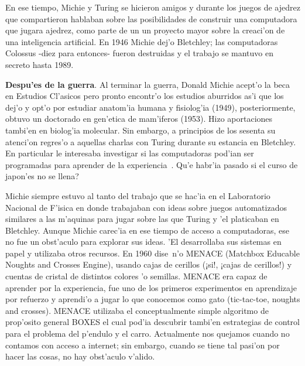 \documentclass[11pt]{article}
\begin{document}
En ese tiempo, Michie y Turing se hicieron amigos y durante los juegos de ajedrez que compartieron hablaban sobre las posibilidades de construir una computadora que jugara ajedrez, como parte de un un proyecto mayor sobre la creaci'on de una inteligencia artificial. En 1946 Michie dej'o Bletchley; las computadoras Colossus -diez para entonces- fueron destruidas y el trabajo se mantuvo en secreto hasta 1989.

\medskip
\textbf{Despu'es de la guerra}. Al terminar la guerra, Donald Michie acept'o la beca en Estudios Cl'asicos pero pronto encontr'o los estudios aburridos as'i que los dej'o y opt'o por estudiar anatom'ia humana y fisiolog'ia (1949), posteriormente, obtuvo un doctorado en gen'etica de mam'iferos (1953). Hizo aportaciones tambi'en en biolog'ia molecular. Sin embargo, a principios de los sesenta su atenci'on regres'o a aquellas charlas con Turing durante su estancia en Bletchley. En particular le interesaba investigar si las computadoras pod'ian ser programadas para aprender de la experiencia~\cite{colossusJack}. \textquestiondown Qu'e habr'ia pasado si el curso de japon'es no se llena?

Michie siempre estuvo al tanto del trabajo que se hac'ia en el Laboratorio Nacional de F'isica en donde trabajaban con ideas sobre juegos automatizados similares a las m'aquinas para jugar sobre las que Turing y 'el platicaban en Bletchley. Aunque Michie carec'ia en ese tiempo de acceso a computadoras, ese no fue un obst'aculo para explorar sus ideas. 'El desarrollaba sus sistemas en papel y utilizaba otros recursos. En 1960 dise~n'o MENACE (Matchbox Educable Noughts and Crosses Engine), usando cajas de cerillos (¡si!, ¡cajas de cerillos!) y cuentas de cristal de distintos colores 'o semillas. MENACE era capaz de aprender por la experiencia, fue uno de los primeros experimentos en aprendizaje por refuerzo y aprendi'o a jugar lo que conocemos como gato (tic-tac-toe, noughts and crosses). MENACE utilizaba el conceptualmente simple algoritmo de prop'osito general BOXES el cual pod'ia descubrir tambi'en estrategias de control para el problema del p'endulo y el carro. Actualmente nos quejamos cuando no contamos con acceso a internet; sin embargo, cuando se tiene tal pasi'on por hacer las cosas, no hay obst'aculo v'alido.
\end{document}
